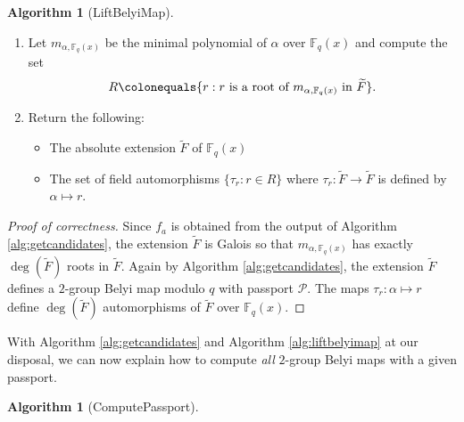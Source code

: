 \documentclass{dcthesis}
\newcommand{\mm}[1]{{\color{blue} \sf MM: [#1]}}
\newcommand{\wt}[1]{\widetilde{#1}}
\newcommand{\FF}{\mathbb{F}}
\numberwithin{equation}{section}
\theoremstyle{definition}
\newtheorem{alg}[equation]{Algorithm}
\theoremstyle{remark}
\begin{document}
{{{\begin{alg}[LiftBelyiMap]
\begin{enumerate}
          a root of $m_{f_a,\FF_q(x)}(y^2)$.
          Let $\wt{F}$ denote the extension
          $\FF_q(x)(\alpha)$.
        \item
          Let $m_{\alpha,\FF_q(x)}$ be the
          minimal polynomial of $\alpha$
          over $\FF_q(x)$ and compute the set
          \begin{equation}
            \label{eqn:factorminpoly}
            R\colonequals
            \{
              r:r\text{ is a root of }
              m_{\alpha,\FF_q(x)}
              \text{ in }
              \wt{F}
            \}.
          \end{equation}
        \item
          Return the following:
          \begin{itemize}
            \item
              The absolute extension $\wt{F}$ of
              $\FF_q(x)$
            \item
              The set of field automorphisms
              $\{\tau_r:r\in R\}$
              where $\tau_r\colon\wt{F}\to\wt{F}$
              is defined by
              $\alpha\mapsto r$.
          \end{itemize}
      \end{enumerate}
    \end{alg}
    \begin{proof}[Proof of correctness]
      Since $f_a$ is obtained from
      the output of
      Algorithm
      \ref{alg:getcandidates},
      the extension
      $\wt{F}$ is Galois
      so that $m_{\alpha,\FF_q(x)}$
      has exactly $\deg(\wt{F})$ roots
      in $\wt{F}$.
      Again by Algorithm
      \ref{alg:getcandidates},
      the extension $\wt{F}$
      defines a $2$-group
      Belyi map modulo $q$
      with passport $\mathcal{P}$.
      The maps $\tau_r\colon\alpha\mapsto r$ define
      $\deg(\wt{F})$ automorphisms of $\wt{F}$
      over $\FF_q(x)$.
    \end{proof}
    With
    Algorithm \ref{alg:getcandidates}
    and Algorithm \ref{alg:liftbelyimap}
    at our disposal,
    we can now explain how to
    compute \emph{all} $2$-group Belyi maps
    with a given passport.
    \begin{alg}[ComputePassport]
      \label{alg:computepassport}
      \,
      \newline

\end{alg}}}}
\end{document}

